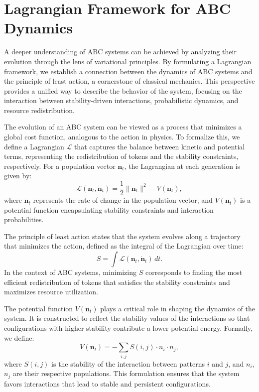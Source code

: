 \documentclass[%
 preprint, linenumbers,
 amsmath,amssymb,
 aps, physrev,
]{revtex4-2}
\begin{document}
\section{Lagrangian Framework for ABC Dynamics}

A deeper understanding of ABC systems can be achieved by analyzing their evolution through the lens of variational principles. By formulating a Lagrangian framework, we establish a connection between the dynamics of ABC systems and the principle of least action, a cornerstone of classical mechanics. This perspective provides a unified way to describe the behavior of the system, focusing on the interaction between stability-driven interactions, probabilistic dynamics, and resource redistribution.

The evolution of an ABC system can be viewed as a process that minimizes a global cost function, analogous to the action in physics. To formalize this, we define a Lagrangian $\mathcal{L}$ that captures the balance between kinetic and potential terms, representing the redistribution of tokens and the stability constraints, respectively. For a population vector $\mathbf{n}_t$, the Lagrangian at each generation is given by:
\begin{equation}
\mathcal{L}(\mathbf{n}_t, \dot{\mathbf{n}}_t) = \frac{1}{2} \|\dot{\mathbf{n}}_t\|^2 - V(\mathbf{n}_t),
\end{equation}
where $\dot{\mathbf{n}}_t$ represents the rate of change in the population vector, and $V(\mathbf{n}_t)$ is a potential function encapsulating stability constraints and interaction probabilities.

The principle of least action states that the system evolves along a trajectory that minimizes the action, defined as the integral of the Lagrangian over time:
\begin{equation}
S = \int \mathcal{L}(\mathbf{n}_t, \dot{\mathbf{n}}_t) \, dt.
\end{equation}
In the context of ABC systems, minimizing $S$ corresponds to finding the most efficient redistribution of tokens that satisfies the stability constraints and maximizes resource utilization.

The potential function $V(\mathbf{n}_t)$ plays a critical role in shaping the dynamics of the system. It is constructed to reflect the stability values of the interactions so that configurations with higher stability contribute a lower potential energy. Formally, we define:
\begin{equation}
V(\mathbf{n}_t) = -\sum_{i,j} S(i, j) \cdot n_i \cdot n_j,
\end{equation}
where $S(i, j)$ is the stability of the interaction between patterns $i$ and $j$, and $n_i$, $n_j$ are their respective populations. This formulation ensures that the system favors interactions that lead to stable and persistent configurations.
\end{document}
